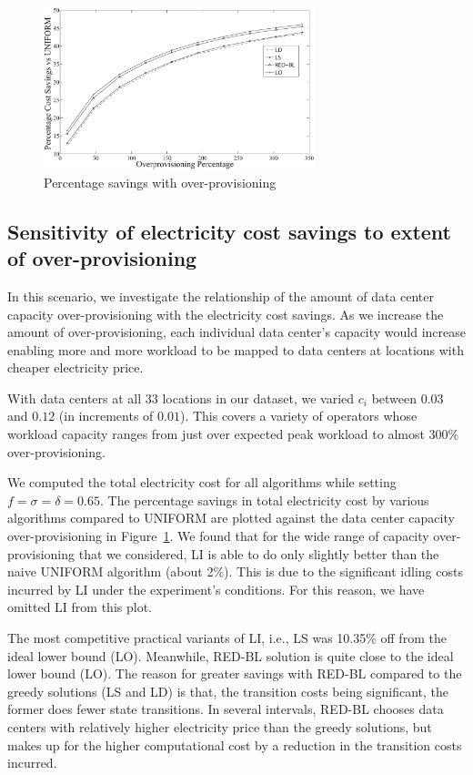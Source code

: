 \begin{figure}
\centering
\includegraphics[width=0.7\textwidth]{pics/s1vseqr.eps}
    \caption{Percentage savings with over-provisioning}
    \label{fig:s1r}
\end{figure}

\subsection{Sensitivity of electricity cost savings to extent of over-provisioning}In this scenario, we investigate the relationship of the amount of data center capacity over-provisioning with the electricity cost savings. As we increase the amount of over-provisioning, each individual data center's capacity would increase enabling more and more workload to be mapped to data centers at locations with cheaper electricity price.

With data centers at all
    $33$ locations in our dataset, we varied $c_i$ between $0.03$ and
    $0.12$ (in increments of $0.01$). This covers a variety of operators whose workload capacity ranges from just over expected peak workload to
almost $300\%$ over-provisioning.

We computed the total electricity cost for all algorithms while setting $f=\sigma=\delta=0.65$. The percentage savings in total electricity cost by various algorithms compared to UNIFORM are plotted against the data center capacity over-provisioning in Figure~\ref{fig:s1r}. We found that for the wide range of capacity over-provisioning that we considered, LI is able to do only slightly better than the naive UNIFORM algorithm (about 2\%). This is due to the significant idling costs incurred by LI under the experiment's conditions. For this reason, we have omitted LI from this plot.

The most competitive practical variants of LI, i.e., LS was 10.35\% off from the ideal lower bound (LO). Meanwhile, RED-BL solution is quite close to the ideal lower bound (LO). The reason for greater savings with RED-BL compared to the greedy solutions (LS and LD) is that, the transition costs being significant, the former does fewer state transitions. In several intervals, RED-BL chooses data centers with relatively higher electricity price than the greedy solutions, but makes up for the higher computational cost by a reduction in the transition costs incurred.

